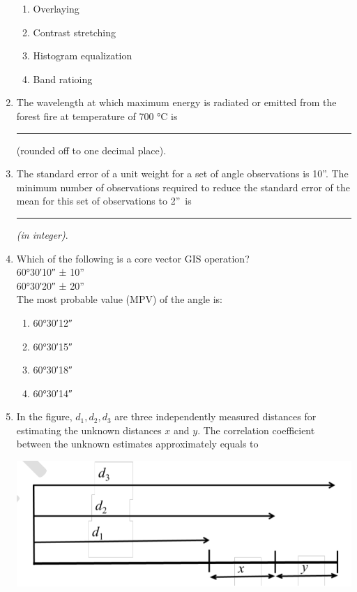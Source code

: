 \documentclass[12pt]{article}
\begin{document}
\begin{enumerate}
\begin{enumerate}
    \item Overlaying 
   \item Contrast stretching 
   \item Histogram equalization 
   \item Band ratioing
\end{enumerate}

\item The wavelength at which maximum energy is radiated or emitted from the forest
fire at temperature of 700 °C is \rule{2cm}{0.15mm} (rounded off to one decimal place).

\item The standard error of a unit weight for a set of angle observations is 10\textquotedblright.
The minimum number of observations required to reduce the standard error of the
mean for this set of observations to 2\textquotedblright\ is  \rule{2cm}{0.15mm} \textit{(in integer)}.

\item  Which of the following is a core vector GIS operation?\\
      \ang{60;30;10} ± 10''\\  
      \ang{60;30;20} ± 20''\\
     The most probable value (MPV) of the angle is: 

\begin{enumerate}
    \item \ang{60;30;12} 
   \item \ang{60;30;15}  
   \item \ang{60;30;18} 
   \item \ang{60;30;14} 
\end{enumerate}

\item In the figure, $d_1, d_2, d_3$ are three independently measured distances for estimating
the unknown distances $x$ and $y$. The correlation coefficient between the unknown
estimates approximately equals to  

\includegraphics[scale = 0.9]{Figs/LatexImage4.png} \\


\end{enumerate}
\end{document}

